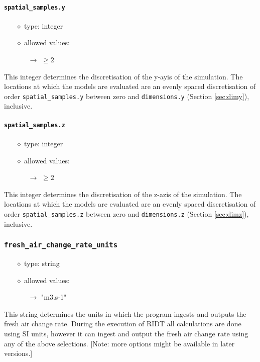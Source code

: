 \documentclass[]{article}
\def\code#1{\texttt{#1}}
\begin{document}
\paragraph{\code{spatial\_samples.y}}
\begin{itemize}
    \item[$\diamond$] type: integer 
    \item[$\diamond$] allowed values:
    \begin{itemize}
        \item[$\rightarrow$] $\geq2$
    \end{itemize}
\end{itemize}
This integer determines the discretisation of the y-ayis of the simulation. The
locations at which the models are evaluated are an evenly spaced discretisation
of order \code{spatial\_samples.y} between zero and \code{dimensions.y} (Section
\ref{sec:dimy}), inclusive.

\paragraph{\code{spatial\_samples.z}}
\begin{itemize}
    \item[$\diamond$] type: integer 
    \item[$\diamond$] allowed values:
    \begin{itemize}
        \item[$\rightarrow$] $\geq2$
    \end{itemize}
\end{itemize}
This integer determines the discretisation of the z-azis of the simulation. The
locations at which the models are evaluated are an evenly spaced discretisation
of order \code{spatial\_samples.z} between zero and \code{dimensions.z} (Section
\ref{sec:dimz}), inclusive.

\subsubsection{\code{fresh\_air\_change\_rate\_units}}\label{sec:freshairchangerateunits}
\begin{itemize}
    \item[$\diamond$] type: string 
    \item[$\diamond$] allowed values:
    \begin{itemize}
        \item[$\rightarrow$] "m3.s-1"
    \end{itemize}
\end{itemize}
This string determines the units in which the program ingests and outputs the
fresh air change rate. During the execution of RIDT all calculations are done
using SI units, however it can ingest and output the fresh air change rate using
any of the above selections. [Note: more options might be available in later
versions.]
\end{document}
